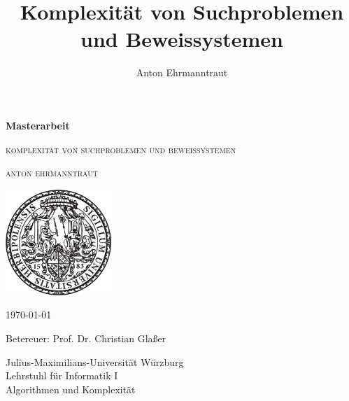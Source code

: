 \documentclass[10pt,a4paper,twoside,openright]{report}
\begin{document}

\pagestyle{empty}
\title{Komplexität von Suchproblemen und Beweissystemen}
\author{Anton Ehrmanntraut}

\begin{center}{

\vspace*{2cm}

{\large\textbf{Masterarbeit}}\par
    \vspace*{1cm}
{\LARGE\textsc{komplexität von suchproblemen und beweissystemen}}\par
    \vspace*{.3cm}
{\large\textsc{anton ehrmanntraut}}\par}
\vspace*{5cm}

\includegraphics[width=4cm]{siegel.pdf}

\vspace*{2cm}


{\large\today}\vspace*{.9cm}

{\large Betereuer: Prof. Dr. Christian Glaßer}\vspace*{.5cm}


{\large
Julius-Maximilians-Universität Würzburg\\
Lehrstuhl für Informatik I\\
Algorithmen und Komplexität\\
}


\end{center}

\cleardoublepage
\restoregeometry

\tableofcontents
\thispagestyle{empty}
\cleardoublepage
{}
\pagestyle{main}








\cleardoublepage




\printbibliography
\end{document}
